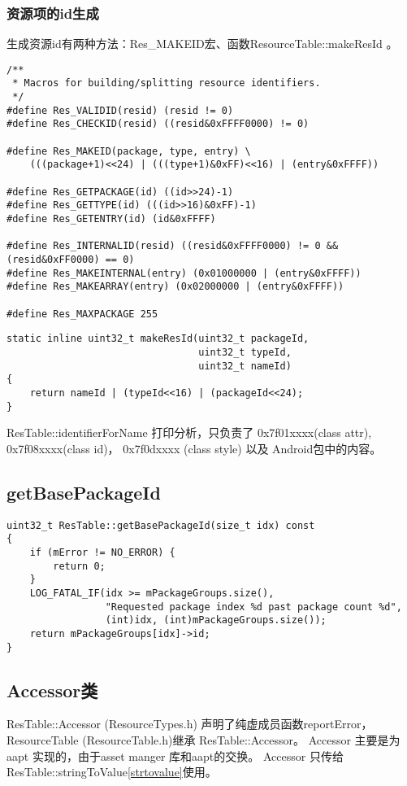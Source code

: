 \documentclass[a4paper,11pt]{article}
\begin{document}
\subsubsection{ 资源项的id生成}
生成资源id有两种方法：Res_MAKEID宏、函数ResourceTable::makeResId 。
\begin{lstlisting}[caption={ResourceTypes.h Res_相关的宏定义}]
/**
 * Macros for building/splitting resource identifiers.
 */
#define Res_VALIDID(resid) (resid != 0)
#define Res_CHECKID(resid) ((resid&0xFFFF0000) != 0)

#define Res_MAKEID(package, type, entry) \
    (((package+1)<<24) | (((type+1)&0xFF)<<16) | (entry&0xFFFF))

#define Res_GETPACKAGE(id) ((id>>24)-1)
#define Res_GETTYPE(id) (((id>>16)&0xFF)-1)
#define Res_GETENTRY(id) (id&0xFFFF)

#define Res_INTERNALID(resid) ((resid&0xFFFF0000) != 0 && (resid&0xFF0000) == 0)
#define Res_MAKEINTERNAL(entry) (0x01000000 | (entry&0xFFFF))
#define Res_MAKEARRAY(entry) (0x02000000 | (entry&0xFFFF))

#define Res_MAXPACKAGE 255
\end{lstlisting}

\begin{lstlisting}[caption={ResourceTable.h的ResourceTable::makeResId}]
static inline uint32_t makeResId(uint32_t packageId,
                                 uint32_t typeId,
                                 uint32_t nameId)
{
    return nameId | (typeId<<16) | (packageId<<24);
}
\end{lstlisting}


ResTable::identifierForName  打印分析，只负责了   0x7f01xxxx(class attr),  0x7f08xxxx(class id)， 0x7f0dxxxx (class  style)  以及 Android包中的内容。

\subsection{getBasePackageId}
\begin{lstlisting}
uint32_t ResTable::getBasePackageId(size_t idx) const
{
    if (mError != NO_ERROR) {
        return 0;
    }
    LOG_FATAL_IF(idx >= mPackageGroups.size(),
                 "Requested package index %d past package count %d",
                 (int)idx, (int)mPackageGroups.size());
    return mPackageGroups[idx]->id;
} 
\end{lstlisting}

\subsection{Accessor类}\label{accessorclass}
ResTable::Accessor (ResourceTypes.h) 声明了纯虚成员函数reportError，
ResourceTable (ResourceTable.h)继承 ResTable::Accessor。
Accessor 主要是为aapt 实现的，由于asset manger 库和aapt的交换。
Accessor 只传给 ResTable::stringToValue\cref{strtovalue}使用。
\end{document}
